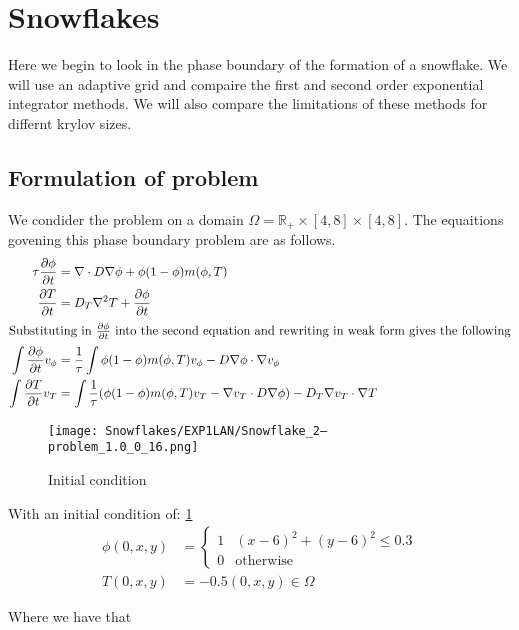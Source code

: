 \section {Snowflakes}
Here we begin to look in the phase boundary of the formation of a snowflake.
We will use an adaptive grid and compaire the first and second order exponential integrator methods.
We will also compare the limitations of these methods for differnt krylov sizes.
\subsection{Formulation of problem}

We condider the problem on a domain $\Omega = \mathbb{R}_+ \times [4, 8] \times [4, 8]$.
The equaitions govening this phase boundary problem are as follows.
\begin{align*}
    \tau \frac{\partial \phi}{\partial t} &= \nabla \cdot D\nabla\phi +  \phi(1-\phi)m(\phi,T)\\
    \frac{\partial T}{\partial t} &= D_T \nabla ^2T + \frac{\partial \phi}{\partial t}\\
    \intertext{Substituting in $\frac{\partial \phi}{\partial t}$ into the second equation and rewriting in weak form gives the following}
    \int \frac{\partial \phi}{\partial t} v_{\phi} &=  \frac 1{\tau}\int \phi(1-\phi)m(\phi,T)v_{\phi} - D \nabla \phi \cdot \nabla v_{\phi}\\
    \int \frac{\partial T}{\partial t} v_T &= \int \frac 1{\tau}(\phi(1-\phi)m(\phi,T)v_T - \nabla v_T \cdot D \nabla \phi) - D_T \nabla v_T \cdot \nabla T
\end{align*}
\begin{figure}[h]
    \centering
    \texttt{[image: Snowflakes/EXP1LAN/Snowflake\_2--problem\_1.0\_0\_16.png]} %
    \caption{Initial condition}
    \label{fig:initial}
\end{figure}
With an initial condition of: \ref{fig:initial}
\begin{align*}
    \phi(0,x,y) &= \begin{cases} 
      1 & (x - 6)^2 + (y - 6)^2 \leq 0.3 \\
      0 & \text{otherwise} \end{cases}\\
    T(0,x,y) &= -0.5 (0,x,y)\in \Omega
\end{align*}

Where we have that

